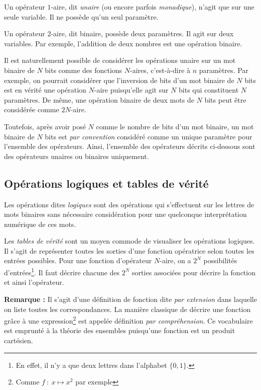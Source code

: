 \documentclass[../../main.tex]{subfiles}
\begin{document}
Un opérateur $1$-aire, dit \textit{unaire} (ou encore parfois \textit{monadique}), n'agit que sur une seule variable. Il ne possède qu'un seul paramètre.

Un opérateur $2$-aire, dit binaire, possède deux paramètres. Il agit sur deux variables. Par exemple, l'addition de deux nombres est une opération binaire.

Il est naturellement possible de considérer les opérations unaire sur un mot binaire de $N$ bits comme des fonctions $N$-aires, c'est-à-dire à $n$ paramètres. Par exemple, on pourrait considérer que l'inversion de bits d'un mot binaire de $N$ bits est en vérité une opération $N$-aire puisqu'elle agit sur $N$ bits qui constituent $N$ paramètres. De même, une opération binaire de deux mots de $N$ bits peut être considérée comme $2N$-aire.

Toutefois, après avoir posé $N$ comme le nombre de bits d'un mot binaire, un mot binaire de $N$ bits est \textit{par convention} considéré comme un unique paramètre pour l'ensemble des opérateurs. Ainsi, l'ensemble des opérateurs décrits ci-dessous sont des opérateurs unaires ou binaires uniquement.
\subsection{Opérations logiques et tables de vérité}
\label{sub:op_rations_logiques_et_tables_de_v_rit_}
Les opérations dites \textit{logiques} sont des opérations qui s'effectuent sur les lettres de mots binaires sans nécessaire considération pour une quelconque interprétation numérique de ces mots.

Les \textit{tables de vérité} sont un moyen commode de visualiser les opérations logiques. Il s'agit de représenter toutes les sorties d'une fonction opératrice selon toutes les entrées possibles. Pour une fonction d'opérateur $N$-aire, on a $2^{N}$ possibilités d'entrées\footnote{En effet, il n'y a que deux lettres dans l'alphabet $\{0, 1\}$.}. Il faut décrire chacune des $2^{N}$ sorties associées pour décrire la fonction et ainsi l'opérateur.

\textbf{Remarque :} Il s'agit d'une définition de fonction dite \textit{par extension} dans laquelle on liste toutes les correspondances. La manière classique de décrire une fonction grâce à une expression\footnote{Comme $f\ :\ x\mapsto{x^{2}}$ par exemple} est appelée définition \textit{par compréhension}. Ce vocabulaire est emprunté à la théorie des ensembles puisqu'une fonction est un produit cartésien.
\end{document}
